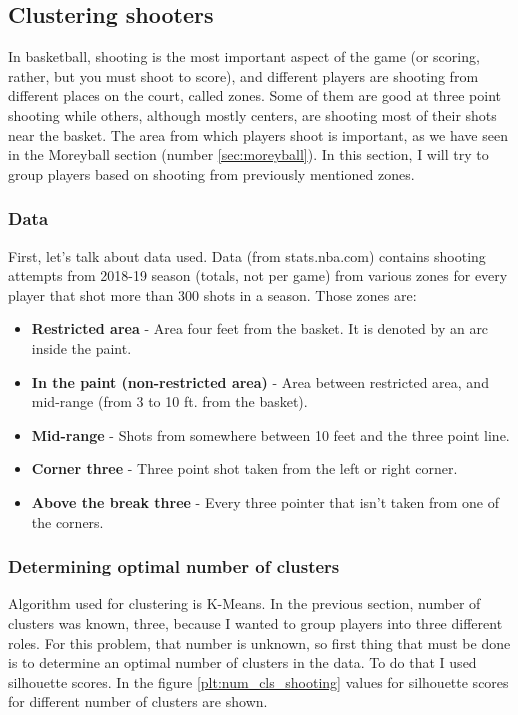 \documentclass[a4paper]{article}
\begin{document}
\subsection{Clustering shooters}
\label{subsec:clust_shooters}

In basketball, shooting is the most important aspect of the game (or scoring, rather, but you must shoot to score), and different players are shooting from different places on the court, called zones. Some of them are good at three point shooting while others, although mostly centers, are shooting most of their shots near the basket. The area from which players shoot is important, as we have seen in the Moreyball section (number \ref{sec:moreyball}). In this section, I will try to group players based on shooting from previously mentioned zones.

\subsubsection{Data}
\label{subsubsec:clust_shooters_data}

First, let's talk about data used. Data (from stats.nba.com) contains shooting attempts from 2018-19 season (totals, not per game) from various zones for every player that shot more than 300 shots in a season. Those zones are:

\begin{itemize}
	\item \textbf{Restricted area} - Area four feet from the basket. It is denoted by an arc inside the paint.
	\item \textbf{In the paint (non-restricted area)} - Area between restricted area, and mid-range (from 3 to 10 ft. from the basket).
	\item \textbf{Mid-range} - Shots from somewhere between 10 feet and the three point line.
	\item \textbf{Corner three} - Three point shot taken from the left or right corner.
	\item \textbf{Above the break three} - Every three pointer that isn't taken from one of the corners. 
\end{itemize}

\subsubsection{Determining optimal number of clusters}
\label{subsubsec:clust_shooters_num_of_clusters}

Algorithm used for clustering is K-Means. In the previous section, number of clusters was known, three, because I wanted to group players into three different roles. For this problem, that number is unknown, so first thing that must be done is to determine an optimal number of clusters in the data. To do that I used silhouette scores. In the figure \ref{plt:num_cls_shooting} values for silhouette scores for different number of clusters are shown. 
\end{document}
